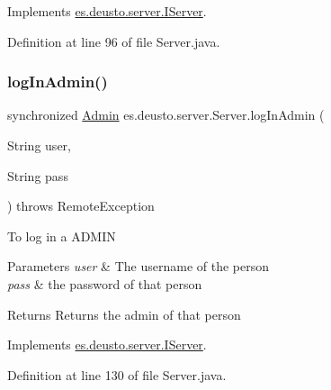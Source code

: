 Implements \hyperlink{interfacees_1_1deusto_1_1server_1_1_i_server_ae6b27c8714c2e2eadc9a55bccb0543fc}{es.\+deusto.\+server.\+I\+Server}.



Definition at line 96 of file Server.\+java.

\mbox{\label{classes_1_1deusto_1_1server_1_1_server_a654d408d0865f8e3f2c931da9e90283a}} 
\subsubsection{\texorpdfstring{log\+In\+Admin()}{logInAdmin()}}
{\footnotesize\ttfamily synchronized \hyperlink{classes_1_1deusto_1_1server_1_1jdo_1_1_admin}{Admin} es.\+deusto.\+server.\+Server.\+log\+In\+Admin (\begin{DoxyParamCaption}\item[{String}]{user,  }\item[{String}]{pass }\end{DoxyParamCaption}) throws Remote\+Exception}

To log in a A\+D\+M\+IN


\begin{DoxyParams}{Parameters}
{\em user} & The username of the person \\
\hline
{\em pass} & the password of that person \\
\hline
\end{DoxyParams}
\begin{DoxyReturn}{Returns}
Returns the admin of that person 
\end{DoxyReturn}


Implements \hyperlink{interfacees_1_1deusto_1_1server_1_1_i_server_a65588c309522410e6a6d9c27d80821a7}{es.\+deusto.\+server.\+I\+Server}.



Definition at line 130 of file Server.\+java.

\mbox{\label{classes_1_1deusto_1_1server_1_1_server_a750bb0d7dbd89246a3602f2e20d03fb5}} 
